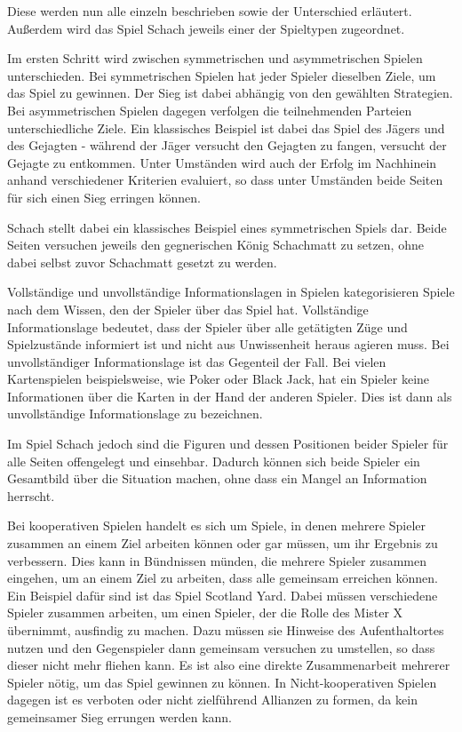Diese werden nun alle einzeln beschrieben sowie der Unterschied erläutert. Außerdem wird das Spiel Schach jeweils einer der Spieltypen zugeordnet.

Im ersten Schritt wird zwischen symmetrischen und asymmetrischen Spielen unterschieden. Bei symmetrischen Spielen hat jeder Spieler dieselben Ziele, um das Spiel zu gewinnen. Der Sieg ist dabei abhängig von den gewählten Strategien. Bei asymmetrischen Spielen dagegen verfolgen die teilnehmenden Parteien unterschiedliche Ziele. \cite{Rodriguez} Ein klassisches Beispiel ist dabei das Spiel des Jägers und des Gejagten - während der Jäger versucht den Gejagten zu fangen, versucht der Gejagte zu entkommen. Unter Umständen wird auch der Erfolg im Nachhinein anhand verschiedener Kriterien evaluiert, so dass unter Umständen beide Seiten für sich einen Sieg erringen können.

Schach stellt dabei ein klassisches Beispiel eines symmetrischen Spiels dar. Beide Seiten versuchen jeweils den gegnerischen König Schachmatt zu setzen, ohne dabei selbst zuvor Schachmatt gesetzt zu werden.

Vollständige und unvollständige Informationslagen in Spielen kategorisieren Spiele nach dem Wissen, den der Spieler über das Spiel hat. Vollständige Informationslage bedeutet, dass der Spieler über alle getätigten Züge und Spielzustände informiert ist und nicht aus Unwissenheit heraus agieren muss. Bei unvollständiger Informationslage ist das Gegenteil der Fall. \cite{Rodriguez} Bei vielen Kartenspielen beispielsweise, wie Poker oder Black Jack, hat ein Spieler keine Informationen über die Karten in der Hand der anderen Spieler. Dies ist dann als unvollständige Informationslage zu bezeichnen.

Im Spiel Schach jedoch sind die Figuren und dessen Positionen beider Spieler für alle Seiten offengelegt und einsehbar. Dadurch können sich beide Spieler ein Gesamtbild über die Situation machen, ohne dass ein Mangel an Information herrscht.

Bei kooperativen Spielen handelt es sich um Spiele, in denen mehrere Spieler zusammen an einem Ziel arbeiten können oder gar müssen, um ihr Ergebnis zu verbessern. Dies kann in Bündnissen münden, die mehrere Spieler zusammen eingehen, um an einem Ziel zu arbeiten, dass alle gemeinsam erreichen können. \cite{Rodriguez} Ein Beispiel dafür sind ist das Spiel Scotland Yard. Dabei müssen verschiedene Spieler zusammen arbeiten, um einen Spieler, der die Rolle des Mister X übernimmt, ausfindig zu machen. Dazu müssen sie Hinweise des Aufenthaltortes nutzen und den Gegenspieler dann gemeinsam versuchen zu umstellen, so dass dieser nicht mehr fliehen kann. Es ist also eine direkte Zusammenarbeit mehrerer Spieler nötig, um das Spiel gewinnen zu können. \cite{Ravensburg2000} In Nicht-kooperativen Spielen dagegen ist es verboten oder nicht zielführend Allianzen zu formen, da kein gemeinsamer Sieg errungen werden kann. \cite{Rodriguez}

